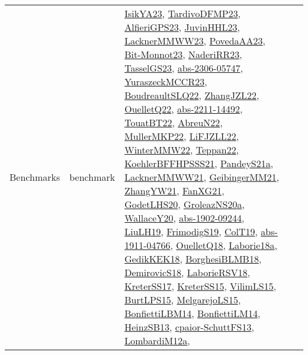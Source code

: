 {\begin{longtable}{lp{3cm}>{\raggedright}p{6cm}>{\raggedright}p{6cm}p{8cm}}
Benchmarks & benchmark & \href{articles/IsikYA23.pdf}{IsikYA23}\cite{IsikYA23}, \href{papers/TardivoDFMP23.pdf}{TardivoDFMP23}\cite{TardivoDFMP23}, \href{articles/AlfieriGPS23.pdf}{AlfieriGPS23}\cite{AlfieriGPS23}, \href{papers/JuvinHHL23.pdf}{JuvinHHL23}\cite{JuvinHHL23}, \href{articles/LacknerMMWW23.pdf}{LacknerMMWW23}\cite{LacknerMMWW23}, \href{papers/PovedaAA23.pdf}{PovedaAA23}\cite{PovedaAA23}, \href{papers/Bit-Monnot23.pdf}{Bit-Monnot23}\cite{Bit-Monnot23}, \href{articles/NaderiRR23.pdf}{NaderiRR23}\cite{NaderiRR23}, \href{papers/TasselGS23.pdf}{TasselGS23}\cite{TasselGS23}, \href{articles/abs-2306-05747.pdf}{abs-2306-05747}\cite{abs-2306-05747}, \href{articles/YuraszeckMCCR23.pdf}{YuraszeckMCCR23}\cite{YuraszeckMCCR23}, \href{papers/BoudreaultSLQ22.pdf}{BoudreaultSLQ22}\cite{BoudreaultSLQ22}, \href{papers/ZhangJZL22.pdf}{ZhangJZL22}\cite{ZhangJZL22}, \href{papers/OuelletQ22.pdf}{OuelletQ22}\cite{OuelletQ22}, \href{articles/abs-2211-14492.pdf}{abs-2211-14492}\cite{abs-2211-14492}, \href{papers/TouatBT22.pdf}{TouatBT22}\cite{TouatBT22}, \href{articles/AbreuN22.pdf}{AbreuN22}\cite{AbreuN22}, \href{articles/MullerMKP22.pdf}{MullerMKP22}\cite{MullerMKP22}, \href{papers/LiFJZLL22.pdf}{LiFJZLL22}\cite{LiFJZLL22}, \href{papers/WinterMMW22.pdf}{WinterMMW22}\cite{WinterMMW22}, \href{papers/Teppan22.pdf}{Teppan22}\cite{Teppan22}, \href{articles/KoehlerBFFHPSSS21.pdf}{KoehlerBFFHPSSS21}\cite{KoehlerBFFHPSSS21}, \href{articles/PandeyS21a.pdf}{PandeyS21a}\cite{PandeyS21a}, \href{papers/LacknerMMWW21.pdf}{LacknerMMWW21}\cite{LacknerMMWW21}, \href{papers/GeibingerMM21.pdf}{GeibingerMM21}\cite{GeibingerMM21}, \href{articles/ZhangYW21.pdf}{ZhangYW21}\cite{ZhangYW21}, \href{articles/FanXG21.pdf}{FanXG21}\cite{FanXG21}, \href{papers/GodetLHS20.pdf}{GodetLHS20}\cite{GodetLHS20}, \href{papers/GroleazNS20a.pdf}{GroleazNS20a}\cite{GroleazNS20a}, \href{articles/WallaceY20.pdf}{WallaceY20}\cite{WallaceY20}, \href{articles/abs-1902-09244.pdf}{abs-1902-09244}\cite{abs-1902-09244}, \href{papers/LiuLH19.pdf}{LiuLH19}\cite{LiuLH19}, \href{papers/FrimodigS19.pdf}{FrimodigS19}\cite{FrimodigS19}, \href{papers/ColT19.pdf}{ColT19}\cite{ColT19}, \href{articles/abs-1911-04766.pdf}{abs-1911-04766}\cite{abs-1911-04766}, \href{papers/OuelletQ18.pdf}{OuelletQ18}\cite{OuelletQ18}, \href{papers/Laborie18a.pdf}{Laborie18a}\cite{Laborie18a}, \href{articles/GedikKEK18.pdf}{GedikKEK18}\cite{GedikKEK18}, \href{articles/BorghesiBLMB18.pdf}{BorghesiBLMB18}\cite{BorghesiBLMB18}, \href{papers/DemirovicS18.pdf}{DemirovicS18}\cite{DemirovicS18}, \href{articles/LaborieRSV18.pdf}{LaborieRSV18}\cite{LaborieRSV18}, \href{articles/KreterSS17.pdf}{KreterSS17}\cite{KreterSS17}, \href{papers/KreterSS15.pdf}{KreterSS15}\cite{KreterSS15}, \href{papers/VilimLS15.pdf}{VilimLS15}\cite{VilimLS15}, \href{papers/BurtLPS15.pdf}{BurtLPS15}\cite{BurtLPS15}, \href{papers/MelgarejoLS15.pdf}{MelgarejoLS15}\cite{MelgarejoLS15}, \href{articles/BonfiettiLBM14.pdf}{BonfiettiLBM14}\cite{BonfiettiLBM14}, \href{papers/BonfiettiLM14.pdf}{BonfiettiLM14}\cite{BonfiettiLM14}, \href{articles/HeinzSB13.pdf}{HeinzSB13}\cite{HeinzSB13}, \href{papers/cpaior-SchuttFS13.pdf}{cpaior-SchuttFS13}\cite{cpaior-SchuttFS13}, \href{articles/LombardiM12a.pdf}{LombardiM12a}\cite{LombardiM12a}, 
\end{longtable}}
